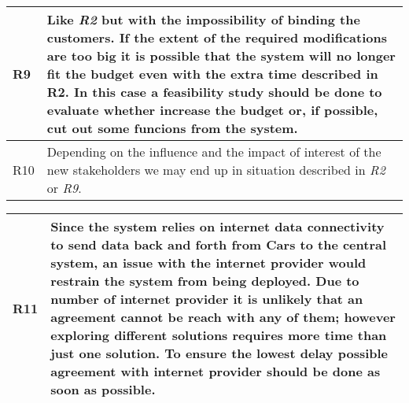 \begin{tabular}{| l | p{13cm}  |}
\hline
R9 & Like \textit{R2} but with the impossibility of binding the customers. If the extent of the required modifications are too big it is possible that the system will no longer fit the budget even with the extra time described in R2. In this case a feasibility study should be done to evaluate whether increase the budget or, if possible, cut out some funcions from the system.\\
\hline
R10 & Depending on the influence and the impact of interest of the new stakeholders we may end up in situation described in \textit{R2} or \textit{R9}.\\
\hline
\end{tabular}
\begin{tabular}{| l | p{13cm}  |}
\hline
R11 & Since the system relies on internet data connectivity to send data back and forth from Cars to the central system, an issue with the internet provider would restrain the system from being deployed. Due to number of internet provider it is unlikely that an agreement cannot be reach with any of them; however exploring different solutions requires more time than just one solution. To ensure the lowest delay possible agreement with internet provider should be done as soon as possible.\\
\hline
\end{tabular}